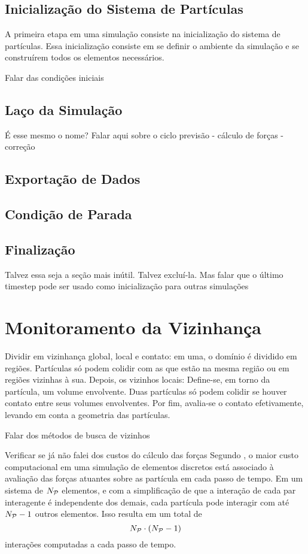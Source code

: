 \subsection{Inicialização do Sistema de Partículas}

A primeira etapa em uma simulação \DEM{} consiste na inicialização do sistema de partículas. Essa inicialização consiste em se definir o ambiente da simulação e se construírem todos os elementos necessários.

\alert{Falar das condições iniciais}

\subsection{Laço da Simulação}
\alert{É esse mesmo o nome? Falar aqui sobre o ciclo previsão - cálculo de forças - correção}

\subsection{Exportação de Dados}

\subsection{Condição de Parada}

\subsection{Finalização}\alert{Talvez essa seja a seção mais inútil. Talvez excluí-la. Mas falar que o último timestep pode ser usado como inicialização para outras simulações}

\section{Monitoramento da Vizinhança} \label{sec:neighborhood}
\alert{Dividir em vizinhança global, local e contato: em uma, o domínio é dividido em regiões. Partículas só podem colidir com as que estão na mesma região ou em regiões vizinhas à sua. Depois, os vizinhos locais: Define-se, em torno da partícula, um volume envolvente. Duas partículas só podem colidir se houver contato entre seus volumes envolventes. Por fim, avalia-se o contato efetivamente, levando em conta a geometria das partículas.}

\alert{Falar dos métodos de busca de vizinhos}

\alert{Verificar se já não falei dos custos do cálculo das forças} Segundo , o maior custo computacional em uma simulação de elementos discretos está associado à avaliação das forças atuantes sobre as partícula em cada passo de tempo. Em um sistema de \(N_{\mathcal{P}}\) elementos, e com a simplificação de que a interação de cada par interagente é independente dos demais, cada partícula pode interagir com até \(N_{\mathcal{P}}-1\) outros elementos. Isso resulta em um total de
\begin{equation*}
	\numberOfParticles\cdot\pqty{\numberOfParticles-1}
\end{equation*}
interações computadas a cada passo de tempo.

